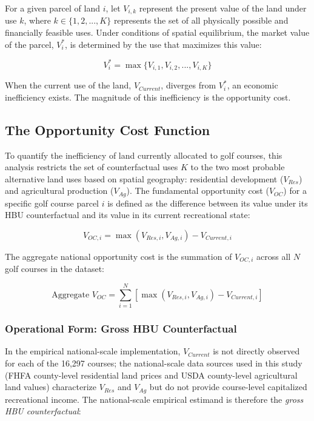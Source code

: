 \documentclass[11pt, letterpaper]{article}
\begin{document}
For a given parcel of land $i$, let $V_{i,k}$ represent the present value of the land under use $k$, where $k \in \{1, 2, ..., K\}$ represents the set of all physically possible and financially feasible uses. Under conditions of spatial equilibrium, the market value of the parcel, $V_i^*$, is determined by the use that maximizes this value:

\begin{equation}
    V_i^* = \max \{V_{i,1}, V_{i,2}, ..., V_{i,K}\}
\end{equation}

When the current use of the land, $V_{Current}$, diverges from $V_i^*$, an economic inefficiency exists. The magnitude of this inefficiency is the opportunity cost.

\subsection{The Opportunity Cost Function}

To quantify the inefficiency of land currently allocated to golf courses, this analysis restricts the set of counterfactual uses $K$ to the two most probable alternative land uses based on spatial geography: residential development ($V_{Res}$) and agricultural production ($V_{Ag}$). The fundamental opportunity cost ($V_{OC}$) for a specific golf course parcel $i$ is defined as the difference between its value under its HBU counterfactual and its value in its current recreational state:

\begin{equation}
    V_{OC, i} = \max(V_{Res, i}, V_{Ag, i}) - V_{Current, i}
\end{equation}

The aggregate national opportunity cost is the summation of $V_{OC, i}$ across all $N$ golf courses in the dataset:

\begin{equation}
    \text{Aggregate } V_{OC} = \sum_{i=1}^{N} \left[ \max(V_{Res, i}, V_{Ag, i}) - V_{Current, i} \right]
\end{equation}

\subsubsection{Operational Form: Gross HBU Counterfactual}

In the empirical national-scale implementation, $V_{Current}$ is not directly observed for each of the 16,297 courses; the national-scale data sources used in this study (FHFA county-level residential land prices and USDA county-level agricultural land values) characterize $V_{Res}$ and $V_{Ag}$ but do not provide course-level capitalized recreational income. The national-scale empirical estimand is therefore the \textit{gross HBU counterfactual}:
\end{document}
